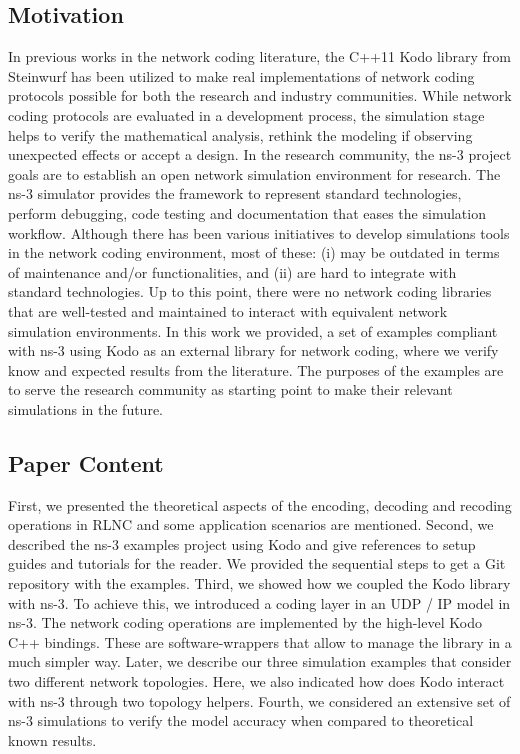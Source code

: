 \subsection*{Motivation}
In previous works in the network coding literature, the C++11 Kodo library from Steinwurf has been utilized to make real implementations of network coding protocols possible for both the research and industry communities. While network coding protocols are evaluated in a development process, the simulation stage helps to verify the mathematical analysis, rethink the modeling if observing unexpected effects or accept a design. In the research community, the ns-3 project goals are to establish an open network simulation environment for research. The ns-3 simulator provides the framework to represent standard technologies, perform debugging, code testing and documentation that eases the simulation workflow. Although there has been various initiatives to develop simulations tools in the network coding environment, most of these: (i) may be outdated in terms of maintenance and/or functionalities, and (ii) are hard to integrate with standard technologies. Up to this point, there were no network coding libraries that are well-tested and maintained to interact with equivalent network simulation environments. In this work we provided, a set of examples compliant with ns-3 using Kodo as an external library for network coding, where we verify know and expected results from the literature. The purposes of the examples are to serve the research community as starting point to make their relevant simulations in the future.

 \subsection*{Paper Content}
First, we presented the theoretical aspects of the encoding, decoding and recoding operations in \ac{RLNC} and some application scenarios are mentioned. Second, we described the ns-3 examples project using Kodo and give references to setup guides and tutorials for the reader. We provided the sequential steps to get a Git repository with the examples. Third, we showed how we coupled the Kodo library with ns-3. To achieve this, we introduced a coding layer in an \ac{UDP} / \ac{IP} model in ns-3. The network coding operations are implemented by the high-level Kodo C++ bindings. These are software-wrappers that allow to manage the library in a much simpler way. Later, we describe our three simulation examples that consider two different network topologies. Here, we also indicated how does Kodo interact with ns-3 through two topology helpers. Fourth, we considered an extensive set of ns-3 simulations to verify the model accuracy when compared to theoretical known results. 

